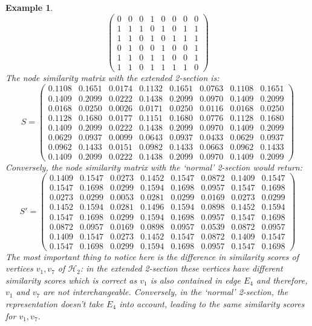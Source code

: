 \documentclass[a4paper,11pt]{report}
\newtheorem{example}[theorem]{Example}
\newcommand{\hgrafeen}{\mathcal{H}}
\begin{document}
\begin{example}
$$\begin{pmatrix}
 0& 0& 0& 1& 0& 0& 0& 0\\
 1& 1& 1& 0& 1& 0& 1& 1\\
 1& 1& 0& 1& 0& 1& 1& 1\\
 0& 1& 0& 0& 1& 0& 0& 1\\
 1& 1& 0& 1& 1& 0& 0& 1\\
1& 1& 0& 1& 1& 1& 1& 0
\end{pmatrix}$$
The node similarity matrix with the extended 2-section is:
$$S = \begin{pmatrix}
\mathbf{0.1108}&\mathbf{0.1651}&\mathbf{0.0174}&\mathbf{0.1132}&\mathbf{0.1651}&\mathbf{0.0763}&\mathbf{0.1108}&\mathbf{0.1651}\\
0.1409&0.2099&0.0222&0.1438&0.2099&0.0970&0.1409&0.2099\\
0.0168&0.0250&0.0026&0.0171&0.0250&0.0116&0.0168&0.0250\\
0.1128&0.1680&0.0177&0.1151&0.1680&0.0776&0.1128&0.1680\\
0.1409&0.2099&0.0222&0.1438&0.2099&0.0970&0.1409&0.2099\\
0.0629&0.0937&0.0099&0.0643&0.0937&0.0433&0.0629&0.0937\\
\mathbf{0.0962}&\mathbf{0.1433}&\mathbf{0.0151}&\mathbf{0.0982}&\mathbf{0.1433}&\mathbf{0.0663}&\mathbf{0.0962}&\mathbf{0.1433}\\
0.1409&0.2099&0.0222&0.1438&0.2099&0.0970&0.1409&0.2099
\end{pmatrix}$$
Conversely, the node similarity matrix with the `normal' 2-section would return:
$$S' = \begin{pmatrix}
\mathbf{0.1409}&\mathbf{0.1547}&\mathbf{0.0273}&\mathbf{0.1452}&\mathbf{0.1547}&\mathbf{0.0872}&\mathbf{0.1409}&\mathbf{0.1547}\\
0.1547&0.1698&0.0299&0.1594&0.1698&0.0957&0.1547&0.1698\\
0.0273&0.0299&0.0053&0.0281&0.0299&0.0169&0.0273&0.0299\\
0.1452&0.1594&0.0281&0.1496&0.1594&0.0898&0.1452&0.1594\\
0.1547&0.1698&0.0299&0.1594&0.1698&0.0957&0.1547&0.1698\\
0.0872&0.0957&0.0169&0.0898&0.0957&0.0539&0.0872&0.0957\\
\mathbf{0.1409}&\mathbf{0.1547}&\mathbf{0.0273}&\mathbf{0.1452}&\mathbf{0.1547}&\mathbf{0.0872}&\mathbf{0.1409}&\mathbf{0.1547}\\
0.1547&0.1698&0.0299&0.1594&0.1698&0.0957&0.1547&0.1698
\end{pmatrix}$$
The most important thing to notice here is the difference in similarity scores 
of vertices $v_1, v_7$ of $\hgrafeen_2$: in the extended 2-section these 
vertices have different similarity scores which is correct as $v_1$ is also contained in edge 
$E_4$ and therefore, $v_1$ and $v_7$ are not interchangeable. Conversely, in the `normal'
2-section, the representation doesn't take $E_4$ into account, leading 
to the same similarity scores for $v_1, v_7$.
\end{example}
\end{document}

